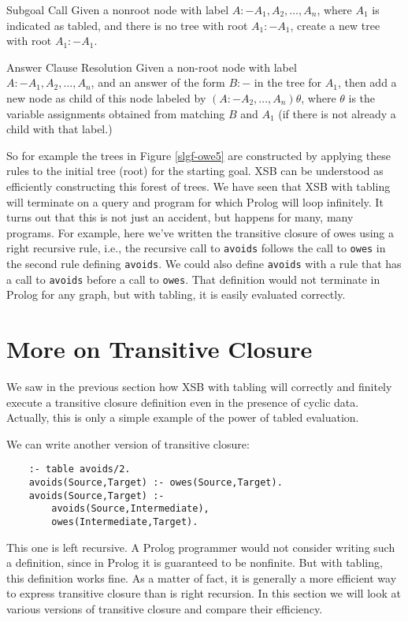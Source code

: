 \begin{definition} {Subgoal Call} \label{def:sgc}
Given a nonroot node with label $A :- A_1, A_2, \ldots, A_n$, where
$A_1$ is indicated as tabled, and there is no tree with root $A_1 :-
A_1$, create a new tree with root $A_1 :- A_1$.
\end{definition}

\begin{definition} {Answer Clause Resolution} \label{def:acl}
Given a non-root node with label \\ $A :- A_1, A_2, \ldots, A_n$, and an
answer of the form $B :-$ in the tree for $A_1$, then add a new node
as child of this node labeled by $(A :- A_2, \ldots, A_n)\theta$,
where $\theta$ is the variable assignments obtained from matching $B$
and $A_1$ (if there is not already a child with that label.)
\end{definition}

So for example the trees in Figure \ref{slgf-owe5} are constructed by
applying these rules to the initial tree (root) for the starting goal.
XSB can be understood as efficiently constructing this forest of
trees.  We have seen that XSB with tabling will terminate on a query
and program for which Prolog will loop infinitely.  It turns out that
this is not just an accident, but happens for many, many programs.
For example, here we've written the transitive closure of owes using a
right recursive rule, i.e., the recursive call to \verb|avoids|
follows the call to \verb|owes| in the second rule defining
\verb|avoids|.  We could also define \verb|avoids| with a rule that
has a call to \verb|avoids| before a call to \verb|owes|.  That
definition would not terminate in Prolog for any graph, but with
tabling, it is easily evaluated correctly.

\section{More on Transitive Closure}

We saw in the previous section how XSB with tabling will correctly and
finitely execute a transitive closure definition even in the presence
of cyclic data.  Actually, this is only a simple example of the power
of tabled evaluation.

We can write another version of transitive closure:
\begin{verbatim}
    :- table avoids/2.
    avoids(Source,Target) :- owes(Source,Target).
    avoids(Source,Target) :-
        avoids(Source,Intermediate),
        owes(Intermediate,Target).
\end{verbatim}
This one is left recursive.  A Prolog programmer would not consider
writing such a definition, since in Prolog it is guaranteed to be
nonfinite.  But with tabling, this definition works fine.  As a matter
of fact, it is generally a more efficient way to express transitive
closure than is right recursion.  In this section we will look at
various versions of transitive closure and compare their efficiency.

